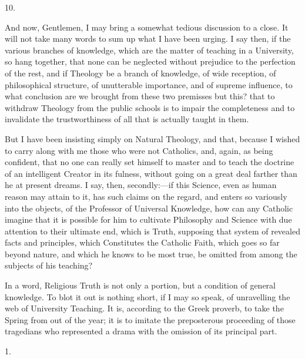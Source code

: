 10.

And now, Gentlemen, I may bring a somewhat tedious discussion to a
close. It will not take many words to sum up what I have been urging.
I say then, if the various branches of knowledge, which are the matter
of teaching in a University, so hang together, that none can be
neglected without prejudice to the perfection of the rest, and if
Theology be a branch of knowledge, of wide reception, of philosophical
structure, of unutterable importance, and of supreme influence, to
what conclusion are we brought from these two premisses but this? that
to withdraw Theology from the public schools is to impair the
completeness and to invalidate the trustworthiness of all that is
actually taught in them.

But I have been insisting simply on Natural Theology, and that,
because I wished to carry along with me those who were not Catholics,
and, again, as being confident, that no one can really set himself to
master and to teach the doctrine of an intelligent Creator in its
fulness, without going on a great deal farther than he at present
dreams. I say, then, secondly:—if this Science, even as human reason
may attain to it, has such claims on the regard, and enters so
variously into the objects, of the Professor of Universal Knowledge,
how can any Catholic imagine that it is possible for him to cultivate
Philosophy and Science with due attention to their ultimate end, which
is Truth, supposing that system of revealed facts and principles,
which Constitutes the Catholic Faith, which goes so far beyond nature,
and which he knows to be most true, be omitted from among the
subjects of his teaching?

In a word, Religious Truth is not only a portion, but a condition
of general knowledge. To blot it out is nothing short, if I may so
speak, of unravelling the web of University Teaching. It is, according
to the Greek proverb, to take the Spring from out of the year; it is
to imitate the preposterous proceeding of those tragedians who
represented a drama with the omission of its principal part.


1.


